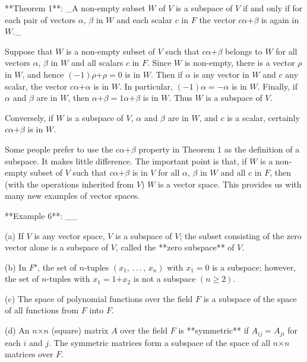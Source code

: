 

**Theorem 1**: _A non-empty subset \(W\) of \(V\) is a subspace of \(V\) if and only if for each pair of vectors \(\alpha\), \(\beta\) in \(W\) and each scalar \(c\) in \(F\) the vector \(c\alpha\)\(+\)\(\beta\) is again in \(W.\)_

Suppose that \(W\) is a non-empty subset of \(V\) such that \(c\alpha\)\(+\)\(\beta\) belongs to \(W\) for all vectors \(\alpha\), \(\beta\) in \(W\) and all scalars \(c\) in \(F.\) Since \(W\) is non-empty, there is a vector \(\rho\) in \(W\), and hence \((-1)\rho\)\(+\)\(\rho\)\(=\)\(0\) is in \(W.\) Then if \(\alpha\) is any vector in \(W\) and \(c\) any scalar, the vector \(c\alpha\)\(+\)\(\alpha\) is in \(W\). In particular, \((-1)\alpha\)\(=\)\(-\alpha\) is in \(W\). Finally, if \(\alpha\) and \(\beta\) are in \(W\), then \(\alpha\)\(+\)\(\beta\)\(=\)\(1\alpha\)\(+\)\(\beta\) is in \(W\). Thus \(W\) is a subspace of \(V\).

Conversely, if \(W\) is a subspace of \(V\), \(\alpha\) and \(\beta\) are in \(W\), and \(c\) is a scalar, certainly \(c\alpha\)\(+\)\(\beta\) is in \(W\).

Some people prefer to use the \(c\alpha\)\(+\)\(\beta\) property in Theorem 1 as the definition of a subspace. It makes little difference. The important point is that, if \(W\) is a non-empty subset of \(V\) such that \(c\alpha\)\(+\)\(\beta\) is in \(V\) for all \(\alpha\), \(\beta\) in \(W\) and all \(c\) in \(F\), then (with the operations inherited from \(V\)) \(W\) is a vector space. This provides us with many new examples of vector spaces.

**Example 6**: __

(a) If \(V\) is any vector space, \(V\) is a subspace of \(V\); the subset consisting of the zero vector alone is a subspace of \(V\), called the **zero subspace** of \(V\).

(b) In \(F\)", the set of \(n\)-tuples \((x_{1},\,.\,.\,.\,,\,x_{n})\) with \(x_{1}\)\(=\)\(0\) is a subspace; however, the set of \(n\)-tuples with \(x_{1}\)\(=\)\(1\)\(+\)\(x_{2}\) is not a subspace \((n\geq 2)\).

(c) The space of polynomial functions over the field \(F\) is a subspace of the space of all functions from \(F\) into \(F\).

(d) An \(n\)\(\times\)\(n\) (square) matrix \(A\) over the field \(F\) is **symmetric** if \(A\)\({}_{ij}\)\(=\)\(A\)\({}_{ji}\) for each \(i\) and \(j\). The symmetric matrices form a subspace of the space of all \(n\)\(\times\)\(n\) matrices over \(F\).

